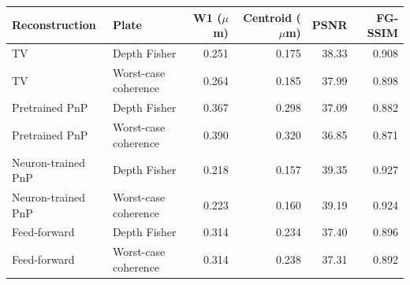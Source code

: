\begin{tabular}{llrrrr}
\toprule
Reconstruction & Plate & W1 ($\mu$m) & Centroid ($\mu$m) & PSNR & FG-SSIM \\
\midrule
TV & Depth Fisher & 0.251 & 0.175 & 38.33 & 0.908 \\
TV & Worst-case coherence & 0.264 & 0.185 & 37.99 & 0.898 \\
\midrule
Pretrained PnP & Depth Fisher & 0.367 & 0.298 & 37.09 & 0.882 \\
Pretrained PnP & Worst-case coherence & 0.390 & 0.320 & 36.85 & 0.871 \\
\midrule
Neuron-trained PnP & Depth Fisher & 0.218 & 0.157 & 39.35 & 0.927 \\
Neuron-trained PnP & Worst-case coherence & 0.223 & 0.160 & 39.19 & 0.924 \\
\midrule
Feed-forward & Depth Fisher & 0.314 & 0.234 & 37.40 & 0.896 \\
Feed-forward & Worst-case coherence & 0.314 & 0.238 & 37.31 & 0.892 \\
\bottomrule
\end{tabular}

